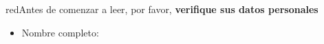 \documentclass{pruebas}
\begin{document}
	\vspace{5mm}
	
	\begin{mybox}{red}{Antes de comenzar a leer, por favor,  \textbf{verifique sus datos personales}}
		\begin{footnotesize}
			\begin{itemize}
				\item Nombre completo: \textbf{ \nombres \, \apellidos}
			\end{itemize}
		\end{footnotesize}
	\end{mybox}
	
%	
	\vspace{4mm}
	
		
	
	\newpage
	
		
	
\end{document}
